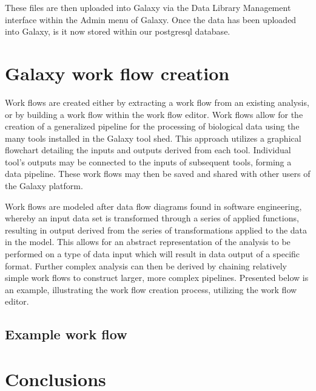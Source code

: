 \documentclass[a4paper,10pt]{article}
\begin{document}
These files are then uploaded into Galaxy via the Data Library Management interface within the Admin menu of Galaxy.  Once the data has been uploaded into Galaxy, is it now stored within our postgresql database.
\section{Galaxy work flow creation}
Work flows are created either by extracting a work flow from an existing analysis, or by building a work flow within the work flow editor.  Work flows allow for the creation of a generalized pipeline for the processing of biological data using the many tools installed in the Galaxy tool shed.  This approach utilizes a graphical flowchart detailing the inputs and outputs derived from each tool.  Individual tool's outputs may be connected to the inputs of subsequent tools, forming a data pipeline.  These work flows may then be saved and shared with other users of the Galaxy platform.

Work flows are modeled after data flow diagrams found in software engineering, whereby an input data set is transformed through a series of applied functions, resulting in output derived from the series of transformations applied to the data in the model.  This allows for an abstract representation of the analysis to be performed on a type of data input which will result in data output of a specific format.  Further complex analysis can then be derived by chaining relatively simple work flows to construct larger, more complex pipelines.  Presented below is an example, illustrating the work flow creation process, utilizing the work flow editor.
\subsection{Example work flow}
\section{Conclusions}
\end{document}
